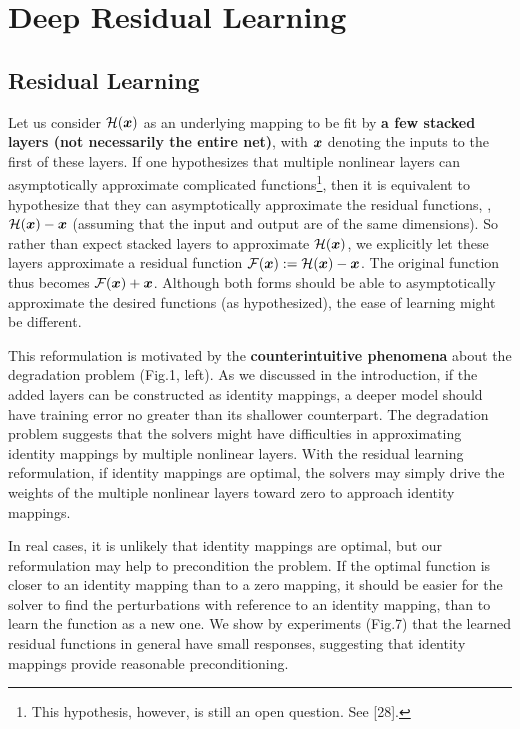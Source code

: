 \section{Deep Residual Learning}

\subsection{Residual Learning}
\label{sec:motivation}

Let us consider $\mathcal{H}(\boldsymbol{x})$ as an underlying mapping to be fit by \textbf{a few stacked layers (not necessarily the entire net)}, with $\boldsymbol{x}$ denoting the inputs to the first of these layers. If one hypothesizes that multiple nonlinear layers can asymptotically approximate complicated functions\footnote{This hypothesis, however, is still an open question. See [28].}, then it is equivalent to hypothesize that they can asymptotically approximate the residual functions, \ie, $\mathcal{H}(\boldsymbol{x})-\boldsymbol{x}$ (assuming that the input and output are of the same dimensions).
So rather than expect stacked layers to approximate $\mathcal{H}(\boldsymbol{x})$, we explicitly let these layers approximate a residual function $\mathcal{F}(\boldsymbol{x}):=\mathcal{H}(\boldsymbol{x})-\boldsymbol{x}$. The original function thus becomes $\mathcal{F}(\boldsymbol{x})+\boldsymbol{x}$. Although both forms should be able to asymptotically approximate the desired functions (as hypothesized), the ease of learning might be different.

This reformulation is motivated by the \textbf{counterintuitive phenomena} about the degradation problem (Fig.1, left). As we discussed in the introduction, if the added layers can be constructed as identity mappings, a deeper model should have training error no greater than its shallower counterpart. The degradation problem suggests that the solvers might have difficulties in approximating identity mappings by multiple nonlinear layers. With the residual learning reformulation, if identity mappings are optimal, the solvers may simply drive the weights of the multiple nonlinear layers toward zero to approach identity mappings.

In real cases, it is unlikely that identity mappings are optimal, but our reformulation may help to precondition the problem. If the optimal function is closer to an identity mapping than to a zero mapping, it should be easier for the solver to find the perturbations with reference to an identity mapping, than to learn the function as a new one. We show by experiments (Fig.7) that the learned residual functions in general have small responses, suggesting that identity mappings provide reasonable preconditioning.

